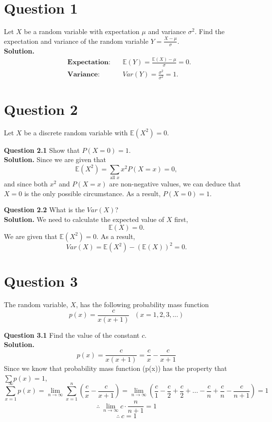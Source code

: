 \documentclass[
]{book}
\begin{document}
\section{Question 1}\label{question-1-1}

Let \(X\) be a random variable with expectation \(\mu\) and variance \(\sigma^2\). Find the expectation and variance of the random variable \(Y = \frac{X - \mu}{\sigma}\).\\
\textbf{Solution.}
\[\begin{aligned} 
&\textbf{Expectation:} \quad & \mathbb{E}(Y) = \frac{\mathbb{E}(X) - \mu}{\sigma} = 0.\\
&\textbf{Variance:}    \quad & Var(Y) =\frac{\sigma^2}{\sigma^2} = 1. 
\end{aligned}\]

\section{Question 2}\label{question-2-1}

Let \(X\) be a discrete random variable with \(\mathbb{E}(X^2) = 0\).

\textbf{Question 2.1} Show that \(P(X = 0) = 1\).\\
\textbf{Solution.} Since we are given that \[\mathbb{E}(X^2) = \sum_{\text{all }x}x^2 P(X = x) = 0,\] and since both \(x^2\) and \(P(X = x)\) are non-negative values, we can deduce that \(X = 0\) is the only possible circumstance. As a result, \(P(X = 0) = 1\).

\textbf{Question 2.2} What is the \(Var(X)\)?\\
\textbf{Solution.} We need to calculate the expected value of \(X\) first, \[\mathbb{E}(X) = 0.\] We are given that \(\mathbb{E}(X^2) = 0\). As a result, \[Var(X) = \mathbb{E}(X^2) - (\mathbb{E}(X))^2 = 0.\]

\section{Question 3}\label{question-3}

The random variable, \(X\), has the following probability mass function \[p(x) = \frac{c}{x(x+1)} \ \ \ (x = 1,2,3,...)\]

\textbf{Question 3.1} Find the value of the constant \(c\).\\
\textbf{Solution.} \[p(x) = \frac{c}{x(x+1)} = \frac{c}{x} - \frac{c}{x+1}\] Since we know that probability mass function (p(x)) has the property that \(\sum p(x) = 1\), \[\sum_{x=1}^{\infty} p(x) = \lim_{n\to\infty}\sum_{x=1}^{n}(\frac{c}{x} - \frac{c}{x+1}) = \lim_{n\to\infty} (\frac{c}{1} - \frac{c}{2} + \frac{c}{2}  + ...  - \frac{c}{n} + \frac{c}{n} - \frac{c}{n+1}) = 1\] \[\therefore \ \lim_{n\to\infty} c \cdot \frac{n}{n+1} = 1\] \[\therefore \ c = 1\]
\end{document}
